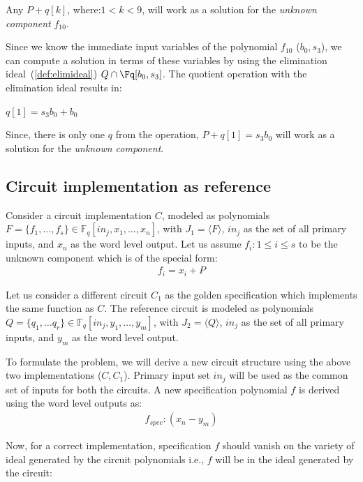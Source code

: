 \begin{Example}
Any $P+q[k]$, where:$1<k<9$, will work as a solution for the \textit{unknown component} $f_{10}$.

Since we know the immediate input variables of the polynomial $f_{10}$ ($b_0,s_3$), we can compute a solution in terms of these variables by using the elimination ideal~(\autoref{def:elimideal}) $Q \cap \Fq[b_0,s_3]$. The quotient operation with the elimination ideal results in:\\
\begin{small}
$q[1]=s_3b_0 + b_0$
\end{small}

Since, there is only one $q$ from the operation, $P+q[1]=s_3b_0$ will work as a solution for the \textit{unknown component}.

\end{Example}

\subsection{Circuit implementation as reference}
Consider a circuit implementation $C$, modeled as polynomials $F = \{f_1,\dots,f_s\}\in \mathbb{F}_q[in_j,x_1,\dots, x_n]$, with $J_1=\langle F \rangle$, $in_j$ as the set of all primary inputs, and $x_n$ as the word level output. Let us assume $f_i:1\le i \le s$ to be the unknown component which is of the special form:
\begin{gather*} 
f_i = x_i + P
\end{gather*}

Let us consider a different circuit $C_1$ as the golden specification which implements the same function as $C$. The reference circuit is modeled as polynomials $Q = \{q_1,\dots q_r\}\in \mathbb{F}_q[in_j,y_1,\dots, y_m]$, with $J_2=\langle Q \rangle$, $in_j$ as the set of all primary inputs, and $y_m$ as the word level output.

To formulate the problem, we will derive a new circuit structure using the above two implementations ($C,C_1$). Primary input set $in_j$ will be used as the common set of inputs for both the circuits. A new specification polynomial $f$ is derived using the word level outputs as:
\begin{gather}
f_{spec} : (x_n-y_m)
\end{gather}

Now, for a correct implementation, specification $f$ should vanish on the variety of ideal generated by the circuit polynomials i.e., $f$ will be in the ideal generated by the circuit:

